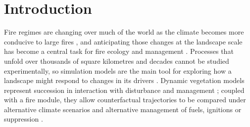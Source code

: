 \documentclass[ResearchPaper,linenum]{CSIRO_LaTeX_Template}
\begin{document}
\maketitle


\section{Introduction}

Fire regimes are changing over much of the world as the climate becomes more
conducive to large fires \citep{flannigan_implications_2009, ellis_global_2022,
senande2022spatial}, and anticipating those changes at the landscape scale has
become a central task for fire ecology and management \citep{mckenzie2011landscape,
moritz2012climate, bowman_vegetation_2020}. Processes that unfold over thousands of
square kilometres and decades cannot be studied experimentally, so simulation models
are the main tool for exploring how a landscape might respond to changes in its
drivers \citep{brown2006landscape, turner2015landscape}. Dynamic vegetation models
represent succession in interaction with disturbance and management
\citep{mladenoff2004landis, hartig2012connecting}; coupled with a fire module, they
allow counterfactual trajectories to be compared under alternative climate scenarios
and alternative management of fuels, ignitions or suppression
\citep{keane2004classification, parisien2019applications}.
\end{document}
